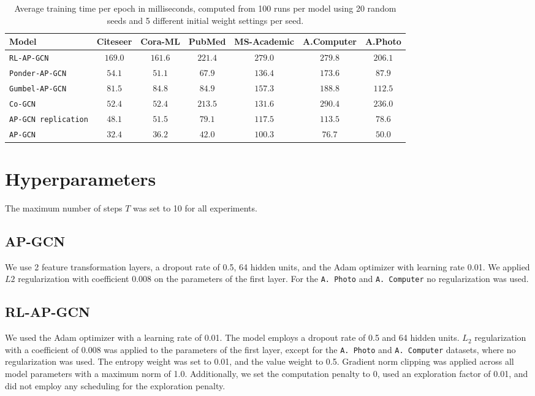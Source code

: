 \documentclass{gdl}
\begin{document}
\begin{table}[h]
    \small\sf\centering
    \caption{Average training time per epoch in milliseconds, computed from 100 runs per model using 20 random seeds and 5 different initial weight settings per seed.}
    \begin{tabular}{l c c c c c c}
        \toprule
        Model & Citeseer & Cora-ML & PubMed & MS-Academic & A.Computer & A.Photo   \\
        \midrule
        \texttt{RL-AP-GCN} &$169.0$&$161.6$&$221.4$&$279.0$&$279.8$&$206.1$  \\
        \texttt{Ponder-AP-GCN} &$54.1$&$51.1$&$67.9$&$136.4$&$173.6$&$87.9$   \\
        \texttt{Gumbel-AP-GCN} &$81.5$&$84.8$&$84.9$&$157.3$&$188.8$&$112.5$   \\
        \texttt{Co-GCN} &$52.4$&$52.4$&$213.5$&$131.6$&$290.4$&$236.0$  \\
        \texttt{AP-GCN replication} &$48.1$&$51.5$&$79.1$&$117.5$&$113.5$&$78.6$  \\
        \midrule
        \texttt{AP-GCN} & $32.4$ & $36.2$ & $42.0$ & $100.3$ & $76.7$ & $50.0$ \\
        \bottomrule 
    \end{tabular}
    \label{tab:time-per-epoch}
\end{table}

\newpage
\twocolumn


\clearpage


\clearpage

\appendix

\section{Hyperparameters}
The maximum number of steps $T$ was set to 10 for all experiments.

\subsection{AP-GCN}
\label{lab:hyper-ap-gcn}
We use 2 feature transformation layers, a dropout rate of 0.5, 64 hidden units, and the Adam optimizer with learning rate 0.01. We applied $L2$ regularization with coefficient 0.008 on the parameters of the first layer. For the \texttt{A. Photo} and \texttt{A. Computer} no regularization was used.

\subsection{RL-AP-GCN}
\label{lab:hyper-rl-gcn}
We used the Adam optimizer with a learning rate of 0.01. The model employs a dropout rate of 0.5 and 64 hidden units. $L_2$ regularization with a coefficient of 0.008 was applied to the parameters of the first layer, except for the \texttt{A. Photo} and \texttt{A. Computer} datasets, where no regularization was used. The entropy weight was set to 0.01, and the value weight to 0.5. Gradient norm clipping was applied across all model parameters with a maximum norm of 1.0. Additionally, we set the computation penalty to 0, used an exploration factor of 0.01, and did not employ any scheduling for the exploration penalty.
\end{document}
